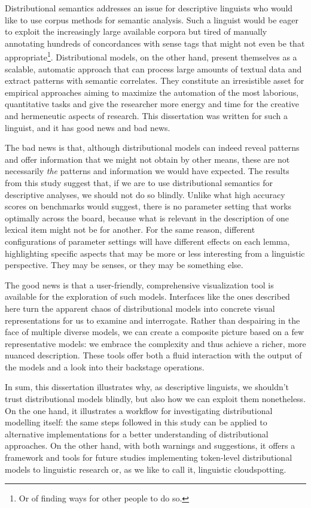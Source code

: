 \documentclass[
]{book}
\begin{document}
Distributional semantics addresses an issue for descriptive linguists who would like to use corpus methods
for semantic analysis. Such a linguist would be eager to exploit the increasingly large available corpora but tired of manually annotating hundreds of concordances with sense tags that might not even be that appropriate\footnote{Or of finding ways for other people to do so.}. Distributional models, on the other hand, present themselves as a scalable, automatic approach that can process large amounts of textual data and extract patterns with semantic correlates. They constitute an irresistible asset for empirical approaches aiming to maximize the automation of the most laborious, quantitative tasks and give the researcher more energy and time for the creative and hermeneutic aspects of research.
This dissertation was written for such a linguist, and it has good news and bad news.

The bad news is that, although distributional models can indeed reveal patterns and
offer information that we might not obtain by other means, these are not necessarily \emph{the} patterns and
information we would have expected. The results from this study suggest that, if we are to use distributional
semantics for descriptive analyses, we should not do so blindly.
Unlike what high accuracy scores on benchmarks would suggest, there is no parameter setting that works optimally across the board, because what is relevant in the description of one lexical item might not be for another. For the same reason, different configurations of parameter settings will have different effects on each lemma, highlighting specific aspects that may be more or less interesting from a linguistic perspective. They may be senses, or they may be something else.

The good news is that a user-friendly, comprehensive visualization tool is available for the exploration of such models. Interfaces like the ones described here turn the apparent chaos of distributional models into concrete visual representations for us to examine and interrogate. Rather than despairing in the face of multiple diverse models, we can create a composite picture based on a few representative models: we embrace the complexity and thus achieve a richer, more nuanced description. These tools offer both a fluid interaction with the output of the models and a look into their backstage operations.

In sum, this dissertation illustrates why, as descriptive linguists, we shouldn't trust distributional models blindly, but also how we can exploit them nonetheless. On the one hand, it illustrates a workflow for investigating distributional modelling itself: the same steps followed in this study can be applied to alternative implementations for a better understanding of distributional approaches. On the other hand, with both warnings and suggestions, it offers a framework and tools for future studies implementing token-level distributional models to linguistic research or, as we like to call it, linguistic cloudspotting.

\printbibliography[heading=bibintoc]


\end{document}
